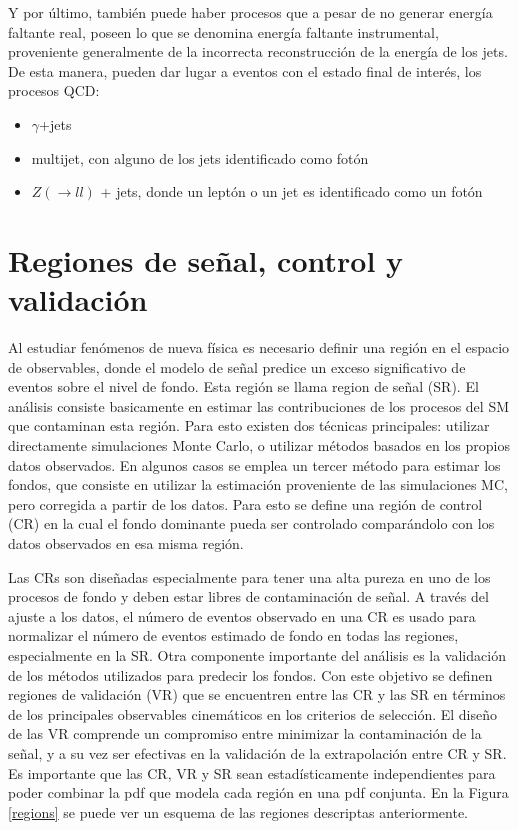 Y por último, también puede haber procesos que a pesar de no generar energía faltante real, poseen lo que se denomina energía faltante instrumental, proveniente generalmente de la incorrecta reconstrucción de la energía de los jets. De esta manera, pueden dar lugar a eventos con el estado final de interés, los procesos QCD:

\begin{itemize}

	\item $\gamma$+jets

	\item multijet, con alguno de los jets identificado como fotón

	\item $Z(\rightarrow ll)$ + jets, donde un leptón o un jet es identificado como un fotón

\end{itemize}



\section{Regiones de señal, control y validación}

Al estudiar fenómenos de nueva física es necesario definir una región en el espacio de observables, donde el modelo de señal predice un exceso significativo de eventos sobre el nivel de fondo. Esta región se llama region de señal (SR). El análisis consiste basicamente en estimar las contribuciones de los procesos del SM que contaminan esta región. Para esto existen dos técnicas principales: utilizar directamente simulaciones Monte Carlo, o utilizar métodos basados en los propios datos observados. En algunos casos se emplea un tercer método para estimar los fondos, que consiste en utilizar la estimación proveniente de las simulaciones MC, pero corregida a partir de los datos. Para esto se define una región de control (CR) en la cual el fondo dominante pueda ser controlado comparándolo con los
datos observados en esa misma región. 

Las CRs son diseñadas especialmente para tener una alta pureza en uno de los procesos de fondo y deben estar libres de contaminación de señal. A través del ajuste a los datos, el número de eventos observado en una CR es usado para normalizar el número de eventos estimado de fondo en todas las regiones, especialmente en la SR. Otra componente importante del análisis es la validación de los métodos utilizados para predecir los fondos. Con este objetivo se definen regiones de validación (VR) que se encuentren entre las CR y las SR en términos de los principales observables cinemáticos en los criterios de selección. El diseño de las VR comprende un compromiso entre minimizar la contaminación de la señal, y a su vez ser efectivas en la validación de la extrapolación entre CR y SR. Es importante que las CR, VR y SR sean estadísticamente independientes para poder combinar la pdf que modela cada región en una pdf conjunta. En la Figura \ref{regions} se puede ver un esquema de las regiones descriptas anteriormente.

